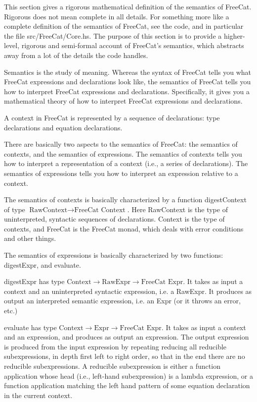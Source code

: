 \documentclass{article}
\begin{document}
This section gives a rigorous mathematical definition of the semantics of FreeCat. Rigorous does not mean complete in all details. For something more like a complete definition of the semantics of FreeCat, see the code, and in particular the file src/FreeCat/Core.hs. The purpose of this section is to provide a higher-level, rigorous and semi-formal account of FreeCat's semantics, which abstracts away from a lot of the details the code handles.

Semantics is the study of meaning. Whereas the syntax of FreeCat tells you what FreeCat expressions and declarations look like, the semantics of FreeCat tells you how to interpret FreeCat expressions and declarations. Specifically, it gives you a mathematical theory of how to interpret FreeCat expressions and declarations.

A context in FreeCat is represented by a sequence of declarations: type declarations and equation declarations.

There are basically two aspects to the semantics of FreeCat: the semantics of contexts, and the semantics of expressions. The semantics of contexts tells you how to interpret a representation of a context (i.e., a series of declarations). The semantics of expressions tells you how to interpret an expression relative to a context.

The semantics of contexts is basically characterized by a function digestContext of type $\text{RawContext} \to \text{FreeCat Context}$. Here RawContext is the type of uninterpreted, syntactic sequences of declarations. Context is the type of contexts, and FreeCat is the FreeCat monad, which deals with error conditions and other things.

The semantics of expressions is basically characterized by two functions: digestExpr, and evaluate.

digestExpr has type $\text{Context} \to \text{RawExpr} \to \text{FreeCat Expr}$. It takes as input a context and an uninterpreted syntactic expression, i.e. a RawExpr. It produces as output an interpreted semantic expression, i.e. an Expr (or it throws an error, etc.)

evaluate has type $\text{Context} \to \text{Expr} \to \text{FreeCat Expr}$. It takes as input a context and an expression, and produces as output an expression. The output expression is produced from the input expression by repeating reducing all reducible subexpressions, in depth first left to right order, so that in the end there are no reducible subexpressions. A reducible subexpression is either a function application whose head (i.e., left-hand subexpression) is a lambda expression, or a function application matching the left hand pattern of some equation declaration in the current context.
\end{document}
